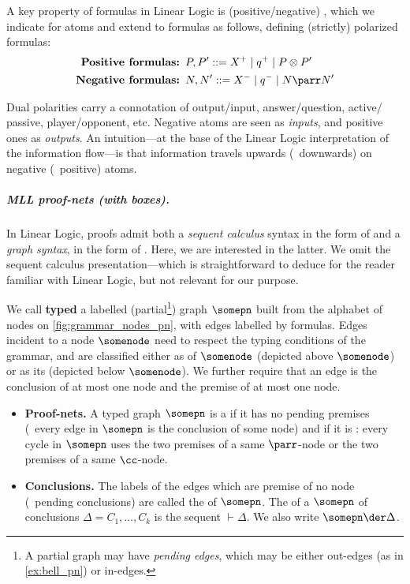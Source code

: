 A key property of formulas in Linear Logic is (positive/negative) , which we indicate for atoms and extend to formulas as follows, defining (strictly) polarized formulas:
\begin{align*}
\textbf{Positive formulas: }& P, P'::= X^+ \mid q^+ \mid P \otimes P'
\\
\textbf{Negative formulas: }& N, N'::= X^- \mid q^- \mid N \parr N'
\end{align*}

\begin{remark}\label{rem:polarity}
Dual polarities carry a connotation of output/input, answer/question, active/ passive, player/opponent, etc.
Negative atoms are seen as \emph{inputs}, and positive ones as \emph{outputs}.
An intuition---at the base of the Linear Logic interpretation of the information flow---is that information travels upwards (\resp\ downwards) on negative (\resp\ positive) atoms.
\end{remark}

\subparagraph{MLL proof-nets (with boxes).}

In Linear Logic, proofs admit both a \emph{sequent calculus} syntax in the form of \textdef{\pts} and a \emph{graph syntax}, in the form of \textdef{\pn}.
Here, we are interested in the latter.
We omit the sequent calculus presentation---which is straightforward to deduce for the reader familiar with Linear Logic, but not relevant for our purpose.

\begin{definition}
\label{def:pn}
We call \textbf{typed} a labelled (partial\footnote{A partial graph may have \emph{pending edges}, which may be either out-edges (as in \cref{ex:bell_pn}) or in-edges.}) graph $\somepn$ built from the alphabet of nodes on \cref{fig:grammar_nodes_pn}, with edges labelled by \MLL formulas.
Edges incident to a node $\somenode$ need to respect the typing conditions of the grammar, and are classified either as  of $\somenode$ (depicted above $\somenode$) or as its  (depicted below $\somenode$).
We further require that an edge is the conclusion of at most one node and the premise of at most one node.
\begin{itemize}
\item
\textbf{Proof-nets.}
A typed graph $\somepn$ is a  if it has no pending premises (\ie\ every edge in $\somepn$ is the conclusion of some node) and if it is :
every cycle in $\somepn$ uses the two premises of a same $\parr$-node or the two premises of a same $\cc$-node.
\item
\textbf{Conclusions.}
The labels of the edges which are premise of no node (\aka\ pending conclusions) are called the  of $\somepn$.
The  of a \pn $\somepn$ of conclusions $\Delta=C_1, \dots, C_k$ is the sequent $\vdash \Delta$.
We also write $\somepn \der \Delta$.
\end{itemize}
\end{definition}


